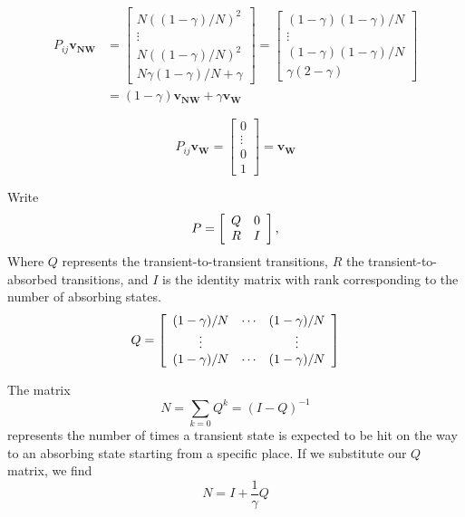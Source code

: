\documentclass[11pt]{article}
\begin{document}
\begin{align}
P_{ij}\mathbf{v_{NW}} &= \left[\begin{array}{c}
N((1-\gamma)/N)^2\\\vdots\\N((1-\gamma)/N)^2\\N\gamma(1-\gamma)/N + \gamma
\end{array}\right] = \left[\begin{array}{c}
(1-\gamma)(1-\gamma)/N\\\vdots\\(1-\gamma)(1-\gamma)/N\\ \gamma(2-\gamma)
\end{array}\right]\\ 
&=(1-\gamma)\mathbf{v_{NW}} + \gamma\mathbf{v_W}
\end{align}

\begin{equation}
P_{ij}\mathbf{v_W} = \left[\begin{array}{c}
0\\\vdots\\0\\1
\end{array}\right] = \mathbf{v_W}
\end{equation}

Write
\begin{equation}
P = \left[\begin{array}{c c}
Q & 0\\
R & I
\end{array}\right],
\end{equation}
Where $Q$ represents the transient-to-transient transitions, $R$ the transient-to-absorbed transitions, and $I$ is the identity matrix with rank corresponding to the number of absorbing states. 
\begin{equation}
Q=\left[\begin{array}{c c c c c c}
(1-\gamma)/N & \cdots & (1-\gamma)/N\\
\vdots& & \vdots \\
 (1-\gamma)/N & \cdots & (1-\gamma)/N
 \end{array}\right]
 \end{equation}

The matrix
\begin{equation}
N = \sum_{k=0}Q^k = (I - Q)^{-1}
\end{equation}
represents the number of times a transient state is expected to be hit on the way to an absorbing state starting from a specific place. If we substitute our $Q$ matrix, we find
\begin{equation}
N = I + \frac{1}{\gamma}Q
\end{equation}
\end{document}
